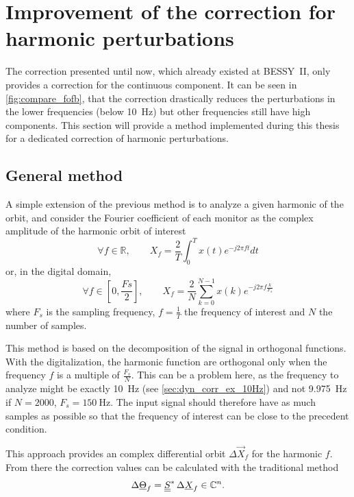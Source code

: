 \section{Improvement of the correction for harmonic perturbations}
\label{sec:dyn_corr}
The correction presented until now, which already existed at BESSY~II, only provides a correction for the continuous component. It can be seen in \cref{fig:compare_fofb}, that the correction drastically reduces the perturbations in the lower frequencies (below \SI{10}{\hertz}) but other frequencies still have high components. This section will provide a method implemented during this thesis for a dedicated correction of harmonic perturbations.

\subsection{General method}
A simple extension of the previous method is to analyze a given harmonic of the orbit, and consider the Fourier coefficient of each monitor as the complex amplitude of the harmonic orbit of interest
\begin{equation}
	\label{eq:orbit_extract}
	\forall f \in \mathbb{R}, \qquad X_f = \frac{2}{T} \int_0^T x(t) e^{-j 2 \pi f t} dt
\end{equation}
or, in the digital domain,
\begin{equation}
\forall f \in \left[0, \frac{Fs}{2}\right], \qquad X_f = \frac{2}{N} \sum\limits_{k=0}^{N-1} x(k) e^{-j 2 \pi f \frac{k}{F_s}}
\end{equation}
where $F_s$ is the sampling frequency, $f = \frac{1}{T}$ the frequency of interest and $N$ the number of samples.

This method is based on the decomposition of the signal in orthogonal functions. With the digitalization, the harmonic function are orthogonal only when the frequency $f$ is a multiple of $\frac{F_s}{N}$. This can be a problem here, as the frequency to analyze might be exactly \SI{10}{\hertz} (see \cref{sec:dyn_corr_ex_10Hz}) and not \SI{9.975}{\hertz} if $N=2000$, $F_s=\SI{150}{\hertz}$. The input signal should therefore have as much samples as possible so that the frequency of interest can be close to the precedent condition.

This approach provides an complex differential orbit $\Delta\vec{X}_f$ for the harmonic $f$. From there the correction values can be calculated with the traditional method
\begin{equation}
\Delta\underline{\Theta}_f = \underline{\underline{S}}^{*}\, \Delta\underline{X}_f   \in \mathbb{C}^n.
\end{equation}

